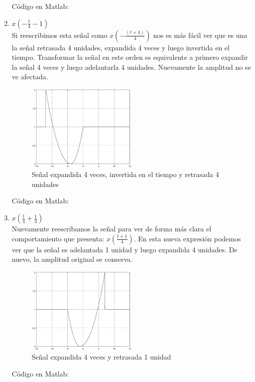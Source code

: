 \documentclass[10pt,a4paper]{report}
\begin{document}
\begin{enumerate}
Código en Matlab:
    
    
  \item $x\left(-\frac{t}{4}-1\right)$\\
  \newline Si reescribimos esta señal como $x\left(-\frac{\left(t+4\right)}{4}\right)$ nos es más fácil ver que es una la señal retrasada 4 unidades, expandida 4 veces y luego invertida en el tiempo. Transformar la señal en este orden es equivalente a primero expandir la señal 4 veces y luego adelantarla 4 unidades. Nuevamente la amplitud no se ve afectada.

    \begin{figure}[H]
      \begin{center}
        \includegraphics[width=0.5\textwidth]{./Ejercicio2/IncisoC}
        \caption{Señal expandida 4 veces, invertida en el tiempo y retrasada 4 unidades}
        \label{fig:IncisoC}
      \end{center}
    \end{figure}
    
Código en Matlab:
    
    \newpage

  \item $x\left(\frac{t}{4}+\frac{1}{4}\right)$\\
  \newline Nuevamente reescribamos la señal para ver de forma más clara el comportamiento que presenta: $x\left(\frac{t+1}{4}\right)$. En esta nueva expresión podemos ver que la señal es adelantada 1 unidad y luego expandida 4 unidades. De nuevo, la amplitud original se conserva.
    \begin{figure}[H]
      \begin{center}
        \includegraphics[width=0.5\textwidth]{./Ejercicio2/IncisoD}
        \caption{Señal expandida 4 veces y retrasada 1 unidad}
        \label{fig:IncisoD}
      \end{center}
    \end{figure}
    
Código en Matlab:
    
    
\end{enumerate}
\end{document}
